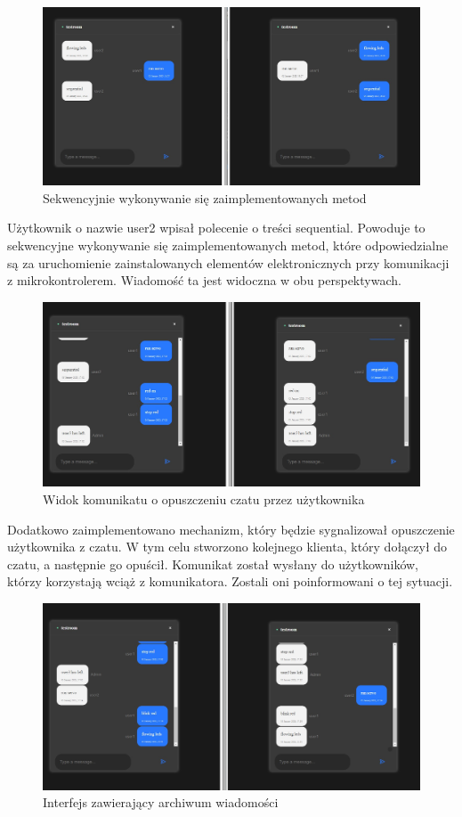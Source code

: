 \begin{figure}[htbp]
	\centering
	\includegraphics[width=0.5\linewidth]{"obrazy/TESTwidok2interfejsysequential"}
	\caption{Sekwencyjnie wykonywanie się zaimplementowanych metod}
	\label{fig:46}
\end{figure}
\newpage
Użytkownik o nazwie user2 wpisał polecenie o treści sequential. Powoduje to sekwencyjne wykonywanie się zaimplementowanych metod, które odpowiedzialne są za uruchomienie zainstalowanych elementów elektronicznych przy komunikacji z mikrokontrolerem. Wiadomość ta jest widoczna w obu perspektywach. 

\begin{figure}[htbp]
	\centering
	\includegraphics[width=0.5\linewidth]{"obrazy/TESTuser3"}
	\caption{Widok komunikatu o opuszczeniu czatu przez użytkownika}
	\label{fig:47}
\end{figure}

Dodatkowo zaimplementowano mechanizm, który będzie sygnalizował opuszczenie użytkownika z czatu. W tym celu stworzono kolejnego klienta, który dołączył do czatu, a następnie go opuścił. Komunikat został wysłany do użytkowników, którzy korzystają wciąż z komunikatora. Zostali oni poinformowani o tej sytuacji.
\begin{figure}[htbp]
	\centering
	\includegraphics[width=0.5\linewidth]{"obrazy/TESTflowingleds"}
	\caption{Interfejs zawierający archiwum wiadomości}
	\label{fig:48}
\end{figure}

